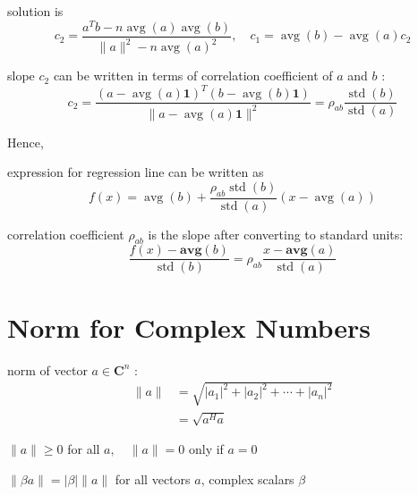 \begin{theorem}
    solution is
$$
c_{2}=\frac{a^{T} b-n \operatorname{avg}(a) \operatorname{avg}(b)}{\|a\|^{2}-n \operatorname{avg}(a)^{2}}, \quad c_{1}=\operatorname{avg}(b)-\operatorname{avg}(a) c_{2}
$$
\end{theorem}

\begin{corollary}
    slope $ c_{2} $ can be written in terms of correlation coefficient of $ a $ and $ b $ :
$$
c_{2}=\frac{(a-\operatorname{avg}(a) \mathbf{1})^{T}(b-\operatorname{a v g}(b) \mathbf{1})}{\|a-\operatorname{a v g}(a) \mathbf{1}\|^{2}}=\rho_{a b} \frac{\operatorname{std}(b)}{\operatorname{std}(a)}
$$
\end{corollary}

Hence, 

\begin{corollary}
    expression for regression line can be written as
$$
f(x)=\operatorname{avg}(b)+\frac{\rho_{a b} \operatorname{std}(b)}{\operatorname{std}(a)}(x-\operatorname{avg}(a))
$$
\end{corollary}

\begin{corollary}
    correlation coefficient $ \rho_{a b} $ is the slope after converting to standard units:
$$
\frac{f(x)-\mathbf{a v g}(b)}{\operatorname{std}(b)}=\rho_{a b} \frac{x-\mathbf{a v g}(a)}{\operatorname{std}(a)}
$$
\end{corollary}



\section{Norm for Complex Numbers}

\begin{definition}
    norm of vector $ a \in \mathbf{C}^{n} $ :
$$
\begin{aligned}
\|a\| &=\sqrt{\left|a_{1}\right|^{2}+\left|a_{2}\right|^{2}+\cdots+\left|a_{n}\right|^{2}} \\
&=\sqrt{a^{H} a}
\end{aligned}
$$
\end{definition}

\begin{theorem}
$ \|a\| \geq 0 $ for all $ a, \quad\|a\|=0  $ only if $ a=0 $
\end{theorem}

\begin{theorem}
    [Homogeneous]
$ \|\beta a\|=|\beta|\|a\| $ for all vectors $ a $, complex scalars $ \beta $
\end{theorem}

